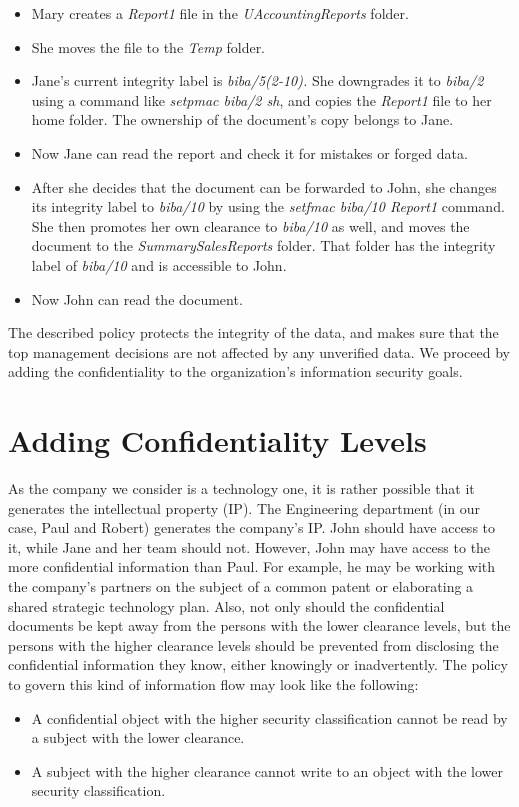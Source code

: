\documentclass[10pt,a4paper,conference,onecolumn]{IEEEtran}
\newcommand{\KBERcode}[1]{\textsl{#1}}
\begin{document}
\begin{itemize}
        \item Mary creates a \KBERcode{Report1} file in the 
        \KBERcode{UAccountingReports} folder.
        \item She moves the file to the \KBERcode{Temp} folder.
        \item Jane's current integrity label is \KBERcode{biba/5(2-10).} 
        She downgrades it to \KBERcode{biba/2} using a command like \KBERcode{setpmac biba/2 sh}, 
        and copies the \KBERcode{Report1} file
        to her home folder. The ownership of the document's copy belongs to Jane.
        \item Now Jane can read the report and check it for mistakes or forged data.
        \item After she decides that the document can be forwarded to John, she changes 
        its integrity label to \KBERcode{biba/10} by using the \KBERcode{setfmac biba/10 Report1} 
        command. She then promotes her own clearance to \KBERcode{biba/10} as well, and moves 
        the document to the \KBERcode{SummarySalesReports} folder. That folder has the integrity 
        label of \KBERcode{biba/10} and is accessible to John.
        \item Now John can read the document.
\end{itemize}

The described policy protects the integrity of the data, and makes sure
that the top management decisions are not affected by any unverified data.
We proceed by adding the confidentiality to the organization's information
security goals.


\section{Adding Confidentiality Levels}

As the company we consider is a technology one, it is rather possible that
it generates the intellectual property (IP). The Engineering department
(in our case, Paul and Robert) generates the company's IP. John should have
access to it, while Jane and her team should not. However, John may have
access to the more confidential information than Paul. For example,
he may be working with the company's partners on the subject of a common
patent or elaborating a shared strategic technology plan. Also, not only
should the confidential documents be kept away from the persons with the
lower clearance levels, but the persons with the higher clearance
levels should be prevented from disclosing the confidential information
they know, either knowingly or inadvertently. The policy to govern 
this kind of information flow may look like the following:
\begin{itemize}
        \item A confidential object with the higher security classification 
        cannot be read by a subject with the lower clearance.
        \item A subject with the higher clearance cannot write to an object
        with the lower security classification.
\end{itemize}
\end{document}
